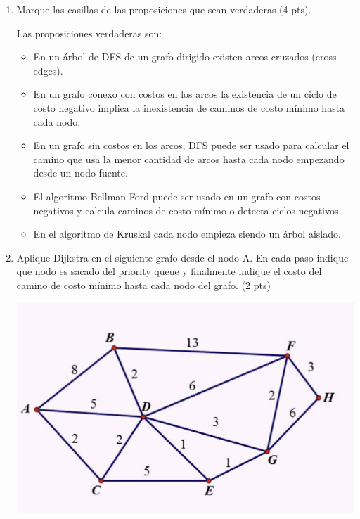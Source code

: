 \documentclass[a4paper,12pt]{article}
\begin{document}
\begin{enumerate}

\item Marque las casillas de las proposiciones que sean verdaderas (4 pts).

Las proposiciones verdaderas son:
\begin{itemize}

\item En un árbol de DFS de un grafo dirigido existen arcos cruzados (cross-edges).

\item En un grafo conexo con costos en los arcos la existencia de un ciclo de costo negativo implica la inexistencia de caminos de costo mínimo hasta cada nodo.

\item En un grafo sin costos en los arcos, DFS puede ser usado para calcular el camino que usa la menor cantidad de arcos hasta cada nodo empezando desde un nodo fuente.

\item El algoritmo Bellman-Ford puede ser usado en un grafo con costos negativos y calcula caminos de costo mínimo o detecta ciclos negativos.

\item En el algoritmo de Kruskal cada nodo empieza siendo un árbol aislado.

\end{itemize}


\item Aplique Dijkstra en el siguiente grafo desde el nodo A. En cada paso indique que nodo es sacado del priority queue y finalmente indique el costo del camino de costo mínimo hasta cada nodo del grafo. (2 pts)
\begin{center}
\par \includegraphics[scale=1.3]{grafosec1} \par
\end{center}


\end{enumerate}
\end{document}
